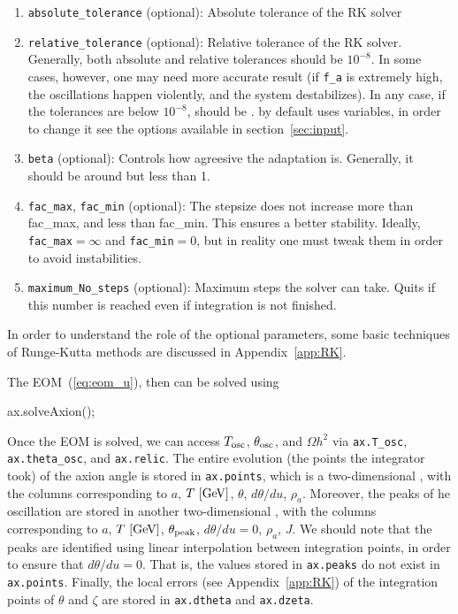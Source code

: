 \documentclass[11pt,a4paper]{article}
\begin{document}
\begin{enumerate}
	\item {\tt absolute\_tolerance} (optional): Absolute tolerance of the RK solver
	
	\item {\tt relative\_tolerance} (optional): Relative tolerance of the RK solver.
	Generally, both absolute and relative tolerances should be $10^{-8}$. 
	In some cases, however, one may need more accurate result (\eg if {\tt f\_a} is extremely high, 
	the oscillations happen violently, and the system destabilizes). In any case, if the  
	tolerances are below $10^{-8}$,  should be . \mimes by default uses  variables, 
	in order to change it see the options available in section~\ref{sec:input}.
	
	\item {\tt beta} (optional): Controls how agreesive the adaptation is. Generally, it should be around but less than 1.
	
	\item {\tt fac\_max},  {\tt fac\_min} (optional): The stepsize does not increase more than fac\_max, and less than fac\_min. 
	This ensures a better stability. Ideally, {\tt fac\_max}$=\infty$ and {\tt fac\_min}$=0$, but in reality one must 
	tweak them in order to avoid instabilities.
	
	\item {\tt maximum\_No\_steps} (optional): Maximum steps the solver can take. Quits if this number is reached even if integration
	is not finished. 
\end{enumerate}
%
In order to understand the role of the optional parameters, some basic techniques of Runge-Kutta methods are discussed in Appendix~\ref{app:RK}. 

The EOM~(\ref{eq:eom_u}), then can be solved using 
%
\begin{cpp}
	ax.solveAxion();
\end{cpp}
%
Once the EOM is solved, we can access $T_{\rm osc}{}$, $\theta_{\rm osc}{}$, and $\Omega h^2$  via {\tt ax.T\_osc}, {\tt ax.theta\_osc}, and {\tt ax.relic}. The entire evolution (the points the integrator took) of the axion angle is stored in {\tt ax.points}, which is a two-dimensional , with the columns corresponding to  $a$, $T~[{\rm GeV}]$, 
$\theta$, $d\theta/du$, $\rho_a$. Moreover, the peaks of he oscillation are stored in another two-dimensional , with the columns corresponding to $a$, $T~[{\rm GeV}]$, $\theta_{\rm peak}{}$, $d\theta/du=0$, $\rho_a$, $J$. We should note that the peaks are identified using linear interpolation between integration points, in order to ensure that $d\theta/du = 0$. That is, the values stored in {\tt ax.peaks} do not exist in {\tt ax.points}. Finally, the local errors (see Appendix~\ref{app:RK}) of the integration points of $\theta$ and $\zeta$ are stored in {\tt ax.dtheta} and {\tt ax.dzeta}.
\end{document}

